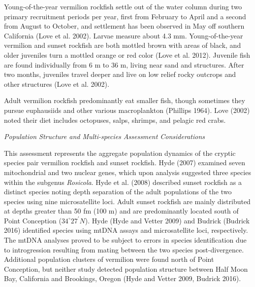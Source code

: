 \documentclass[11pt,
  english,
  a4paper,
]{article}
\begin{document}
Young-of-the-year vermilion rockfish settle out of the water column during two primary recruitment periods per year, first from February to April and a second from August to October, and settlement has been observed in May off southern California {(Love et al. 2002)\leavevmode\tagmcend\tagstructend}. Larvae measure about 4.3 mm. Young-of-the-year vermilion and sunset rockfish are both mottled brown with areas of black, and older juveniles turn a mottled orange or red color {(Love et al. 2012)\leavevmode\tagmcend\tagstructend}. Juvenile fish are found individually from 6 m to 36 m, living near sand and structures. After two months, juveniles travel deeper and live on low relief rocky outcrops and other structures {(Love et al. 2002)\leavevmode\tagmcend\tagstructend}.

Adult vermilion rockfish predominantly eat smaller fish, though sometimes they pursue euphausiids and other various macroplankton {(Phillips 1964)\leavevmode\tagmcend\tagstructend}. Love {(2002)\leavevmode\tagmcend\tagstructend} noted their diet includes octopuses, salps, shrimps, and pelagic red crabs.

\emph{Population Structure and Multi-species Assessment Considerations}

This assessment represents the aggregate population dynamics of the cryptic species pair vermilion rockfish and sunset rockfish. Hyde {(2007)\leavevmode\tagmcend\tagstructend} examined seven mitochondrial and two nuclear genes, which upon analysis suggested three species within the subgenus \emph{Rosicola}. Hyde et al. {(2008)\leavevmode\tagmcend\tagstructend} described sunset rockfish as a distinct species noting depth separation of the adult populations of the two species using nine microsatellite loci. Adult sunset rockfish are mainly distributed at depths greater than 50 fm (100 m) and are predominantly located south of Point Conception ($34^\circ 27^\prime N$). Hyde {(Hyde and Vetter 2009)\leavevmode\tagmcend\tagstructend} and Budrick {(Budrick 2016)\leavevmode\tagmcend\tagstructend} identified species using mtDNA assays and microsatellite loci, respectively. The mtDNA analyses proved to be subject to errors in species identification due to introgression resulting from mating between the two species post-divergence. Additional population clusters of vermilion were found north of Point Conception, but neither study detected population structure between Half Moon Bay, California and Brookings, Oregon {(Hyde and Vetter 2009, Budrick 2016)\leavevmode\tagmcend\tagstructend}.
\end{document}
